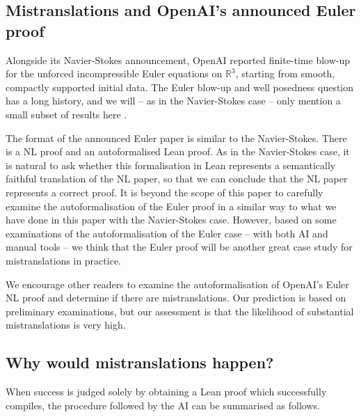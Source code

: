 \documentclass[10pt, a4paper, reqno]{amsart}
\numberwithin{equation}{section}
\theoremstyle{definition}
\theoremstyle{definition}
\begin{document}
\subsection{Mistranslations and OpenAI's announced Euler proof} Alongside its Navier-Stokes announcement, OpenAI reported finite-time blow-up for the unforced incompressible Euler equations on \(\mathbb{R}^{3}\), starting from smooth, compactly supported initial data. The Euler blow-up and well posedness question has a long history, and we will -- as in the Navier-Stokes case -- only mention a small subset of results here  \cite{BealeKatoMajda1984,ConstantinFeffermanMajda1996,LuoHou2014,Elgindi2021, ChenHou2022Analysis, ChenHou2025Numerics, AlpogeBuckmaster2026Euler, DeLellisSzekelyhidi2009DifferentialInclusion, CordobaMartinezZoroa2024IPM}.

The format of the announced Euler paper is similar to the Navier-Stokes. There is a NL proof and an autoformalised Lean proof. As in the Navier-Stokes case, it is natural to ask whether this formalisation in Lean represents a semantically faithful translation of the NL paper, so that we can conclude that the NL paper represents a correct proof.  It is beyond the scope of this paper to carefully examine the autoformalisation of the Euler proof in a similar way to what we have done in this paper with the Navier-Stokes case. However, based on some examinations of the autoformalisation of the Euler case -- with both AI and manual tools -- we think that the Euler proof will be another great case study for mistranslations in practice.    

We encourage other readers to examine the autoformalisation of OpenAI's Euler NL proof and determine if there are mistranslations. Our prediction is based on preliminary examinations, but our assessment is that the likelihood of substantial mistranslations is very high. 


\subsection{Why would mistranslations happen?}

When success is judged solely by obtaining a Lean proof which successfully compiles, the procedure followed by the AI can be summarised as follows.
\end{document}
